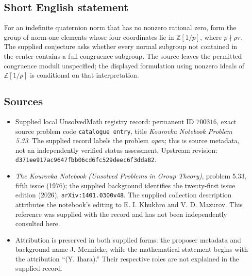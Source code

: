 \documentclass[11pt]{article}
\newcommand{\Z}{\mathbb{Z}}
\begin{document}
\subsection{Short English statement}
For an indefinite quaternion norm that has no nonzero rational zero, form the group of norm-one elements whose four coordinates lie in \(\Z[1/p]\), where \(p\nmid\rho\tau\). The supplied conjecture asks whether every normal subgroup not contained in the center contains a full congruence subgroup. The source leaves the permitted congruence moduli unspecified; the displayed formulation using nonzero ideals of \(\Z[1/p]\) is conditional on that interpretation.
\subsection{Sources}
\begin{itemize}
\item Supplied local UnsolvedMath registry record: permanent ID \(700316\), exact source problem code \texttt{catalogue entry}, title \emph{Kourovka Notebook Problem 5.33}. The supplied record labels the problem \emph{open}; this is source metadata, not an independently verified status assessment. Upstream revision: \texttt{d371ee917ac9647fbb06cd6fc529deec6f3dda82}.
\item \emph{The Kourovka Notebook (Unsolved Problems in Group Theory)}, problem 5.33, fifth issue (1976); the supplied background identifies the twenty-first issue edition (2026), \texttt{arXiv:1401.0300v48}. The supplied collection description attributes the notebook's editing to E. I. Khukhro and V. D. Mazurov. This reference was supplied with the record and has not been independently consulted here.
\item Attribution is preserved in both supplied forms: the proposer metadata and background name J. Mennicke, while the mathematical statement begins with the attribution ``(Y. Ihara).'' Their respective roles are not explained in the supplied record.
\end{itemize}
\end{document}
